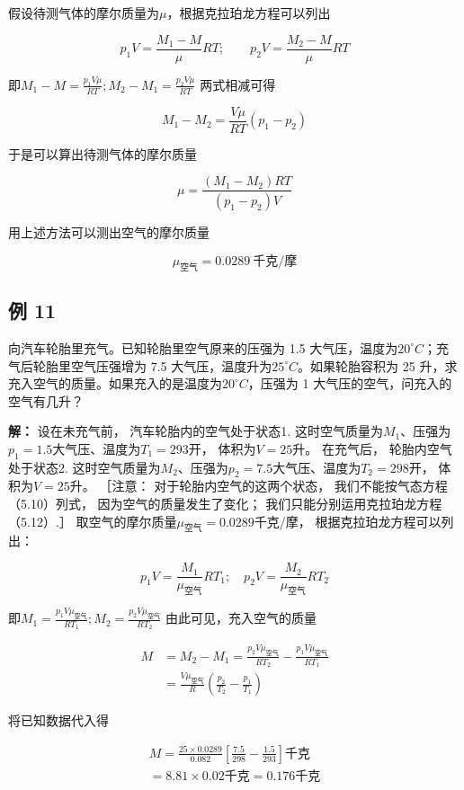 假设待测气体的摩尔质量为\(\mu\)，根据克拉珀龙方程可以列出

\[
p_1V=\frac{M_1-M}{\mu}RT;\qquad p_2V=\frac{M_2-M}{\mu}RT
\]

即\(M_{1} - M = \frac{p_{1}V\mu}{RT}; M_{2} - M_{1} = \frac{p_{2}V\mu}{RT}\)
两式相减可得

\[
M_1-M_2=\frac{V\mu}{RT}(p_1-p_2)
\]

于是可以算出待测气体的摩尔质量

\[
\mu = \frac {(M _ {1} - M _ {2}) R T}{(p _ {1} - p _ {2}) V}
\]

用上述方法可以测出空气的摩尔质量

\[
\mu_{\text{空气}}=0.0289\ \text{千克/摩}
\]

\subsection{例 11}\label{ux4f8b-11-1}

向汽车轮胎里充气。已知轮胎里空气原来的压强为 1.5
大气压，温度为\(20^{\circ}C\)；充气后轮胎里空气压强增为 7.5
大气压，温度升为\(25^{\circ}C\)。如果轮胎容积为 25
升，求充入空气的质量。如果充入的是温度为\(20^{\circ}C\)，压强为 1
大气压的空气，问充入的空气有几升？

\textbf{解：} 设在未充气前， 汽车轮胎内的空气处于状态1.
这时空气质量为\(M_{1}\)、压强为\(p_{1} = 1.5\)大气压、温度为\(T_{1} = 293\)开，
体积为\(V = 25\)升。 在充气后， 轮胎内空气处于状态2.
这时空气质量为\(M_{2}\)、压强为\(p_{2} = 7.5\)大气压、温度为\(T_{2} = 298\)开，
体积为\(V = 25\)升。 ［注意： 对于轮胎内空气的这两个状态，
我们不能按气态方程（5.10）列式， 因为空气的质量发生了变化；
我们只能分别运用克拉珀龙方程（5.12）.］
取空气的摩尔质量\(\mu_{\text{空气}} = 0.0289\)千克/摩，
根据克拉珀龙方程可以列出：

\[
p _ {1} V = \frac {M _ {1}}{\mu_ {\text{空气}}} R T _ {1}; \quad p _ {2} V = \frac {M _ {2}}{\mu_ {\text{空气}}} R T _ {2}
\]

即\(M_{1} = \frac{p_{1}V\mu_{\text{空气}}}{RT_{1}}; M_{2} = \frac{p_{2}V\mu_{\text{空气}}}{RT_{2}}\)
由此可见，充入空气的质量

\[
\begin{aligned}M&=M_2-M_1=\frac{p_2V\mu_{\text{空气}}}{RT_2}-\frac{p_1V\mu_{\text{空气}}}{RT_1}\\&=\frac{V\mu_{\text{空气}}}{R}\left(\frac{p_2}{T_2}-\frac{p_1}{T_1}\right)\end{aligned}
\]

将已知数据代入得

\[
\begin{array}{l} M = \frac {25 \times 0.0289}{0.082} \left[ \frac {7.5}{298} - \frac {1.5}{293} \right] \text{千克} \\ = 8.81 \times 0.02 \text{千克} = 0.176 \text{千克} \\ \end{array}
\]

